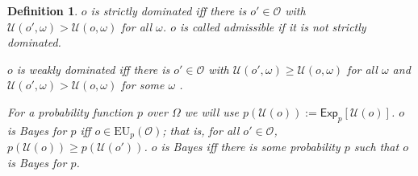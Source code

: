 \documentclass[a4paper]{article}
\newtheorem{definition}{Definition}
\newcommand\Exp{\mathsf{Exp}}
\newcommand\EU{\mathrm{EU}}
\renewcommand\O{\mathcal{O}}
\newcommand\Uwald{\mathcal{U}} %
\renewcommand{\Re}{\mathbb{R}}
\newcommand\SetDelimiter[1][]{
	\nonscript\,#1\vert \allowbreak \nonscript\,\mathopen{}}
\providecommand\given{\SetDelimiter}
\renewcommand{\geq}{\geqslant}
\newenvironment{CCM rewritten}
{\begingroup\color{blue}} %
{\endgroup}              %
\begin{document}
















%






\begin{definition}
	$o$ is \emph{strictly dominated} iff there is $o'\in\O$ with $\Uwald(o',\omega)>\Uwald(o,\omega)$ for all $\omega$. $o$ is called \emph{admissible} if it is not strictly dominated. 
	
	$o$ is \emph{weakly dominated} iff there is $o'\in\O$ with $\Uwald(o',\omega)\geq\Uwald(o,\omega)$ for all $\omega$ and $\Uwald(o',\omega)>\Uwald(o,\omega)$ for some $\omega$ .
	
	For a probability function $p$ over $\Omega$ we will use $p(\Uwald(o)):=\Exp_p[\Uwald(o)]$. 
	$o$ is \emph{Bayes for $p$} iff $o\in\EU_p(\O)$; that is, for all $o'\in\O$, $p(\Uwald(o))\geq p(\Uwald(o'))$. 
	$o$ is \emph{Bayes} iff there is some probability $p$ such that $o$ is Bayes for $p$. 
\end{definition}
\end{document}
